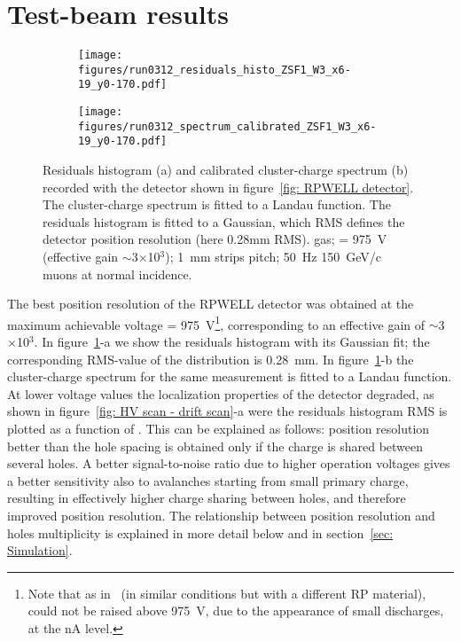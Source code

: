 \section{Test-beam results}
\label{sec: Results}

\begin{figure}[h]
\begin{subfigure}[t]{0.5\textwidth}\caption{}
\texttt{[image: figures/run0312\_residuals\_histo\_ZSF1\_W3\_x6-19\_y0-170.pdf]}
\end{subfigure}
\begin{subfigure}[t]{0.5\textwidth}\caption{}
\texttt{[image: figures/run0312\_spectrum\_calibrated\_ZSF1\_W3\_x6-19\_y0-170.pdf]}
\end{subfigure}
\caption{Residuals histogram (a) and calibrated cluster-charge spectrum (b) recorded with the detector shown in figure~\ref{fig: RPWELL detector}. The cluster-charge spectrum is fitted to a Landau function. The residuals histogram is fitted to a Gaussian, which RMS defines the detector position resolution (here 0.28mm RMS). \nech gas; \dvrpwell= 975~V (effective gain $\sim$3$\times$10$^3$); 1~mm strips pitch; 50~Hz 150~GeV/c muons at normal incidence. }\label{fig: spectrum - residuals histo}
\end{figure}

The best position resolution of the RPWELL detector was obtained at the maximum achievable voltage \dvrpwell = 975~V\footnote{Note that as in~\cite{bressler2016first} (in similar conditions but with a different RP material), \dvrpwell could not be raised above 975~V, due to the appearance of small discharges, at the nA level.}, corresponding to an effective gain of $\sim$3$\times$10$^3$. In figure~\ref{fig: spectrum - residuals histo}-a we show the residuals histogram with its Gaussian fit; the corresponding RMS-value of the distribution is 0.28~mm. In figure~\ref{fig: spectrum - residuals histo}-b the cluster-charge spectrum for the same measurement is fitted to a Landau function.  At lower voltage values the localization properties of the detector degraded, as shown in figure~\ref{fig: HV scan - drift scan}-a were the residuals histogram RMS is plotted as a function of \dvrpwell. This can be explained as follows: position resolution better than the hole spacing is obtained only if the charge is shared between several holes. A better signal-to-noise ratio due to higher operation voltages gives a better sensitivity also to avalanches starting from small primary charge, resulting in effectively higher charge sharing between holes, and therefore improved position resolution. The relationship between position resolution and holes multiplicity is explained in more detail below and in section~\ref{sec: Simulation}. 

